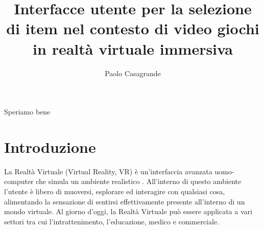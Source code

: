 \documentclass[target=bach,aauheader=]{thud}
\title{Interfacce utente per la selezione \\ di item nel contesto di video giochi \\ in realtà virtuale immersiva}
\author{Paolo Casagrande}
\begin{document}
\maketitle


\acknowledgements
Speriamo bene

\tableofcontents


\listoffigures

\mainmatter

\chapter{Introduzione} %
\label{intro}
La Realtà Virtuale (Virtual Reality, VR) è un'interfaccia avanzata uomo-computer che simula un ambiente realistico \cite{Zheng}.
All'interno di questo ambiente l'utente è libero di muoversi, esplorare ed interagire con qualsiasi cosa, alimentando la sensazione di sentirsi effettivamente presente all'interno di un mondo virtuale.
Al giorno d'oggi, la Realtà Virtuale può essere applicata a vari settori tra cui l'intrattenimento, l'educazione, medico e commerciale. \\
\end{document}

